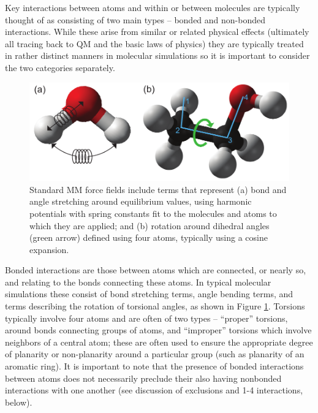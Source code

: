 \documentclass[9pt,bestpractices]{livecoms}
\begin{document}
Key interactions between atoms and within or between molecules are typically thought of as consisting of two main types -- bonded and non-bonded interactions. 
While these arise from similar or related physical effects (ultimately all tracing back to QM and the basic laws of physics) they are typically treated in rather distinct manners in molecular simulations so it is important to consider the two categories
separately.

\begin{figure}[h]
\centering
\includegraphics[width=\linewidth]{potentials_basic_horiz.pdf}
\caption{Standard MM force fields include terms that represent (a) bond and angle stretching around equilibrium values, using harmonic potentials with spring constants fit to the molecules and atoms to which they are applied; and (b) rotation around dihedral angles (green arrow) defined using four atoms, typically using a cosine expansion.}
\label{potentials}
\end{figure}

Bonded interactions are those between atoms which are connected, or nearly so, and relating to the bonds connecting these atoms. 
In typical molecular simulations these consist of bond stretching terms, angle bending terms, and terms describing the rotation of torsional angles, as shown in Figure \ref{potentials}. 
Torsions typically involve four atoms and are often of two types -- ``proper'' torsions, around bonds connecting groups of atoms, and ``improper''
torsions which involve neighbors of a central atom; these are often used to ensure the appropriate degree of planarity or non-planarity around a particular group (such as planarity of an aromatic ring). 
It is important to note that the presence of bonded interactions between atoms does not necessarily preclude their also having nonbonded interactions with one another (see discussion of exclusions and 1-4 interactions, below).
\end{document}
